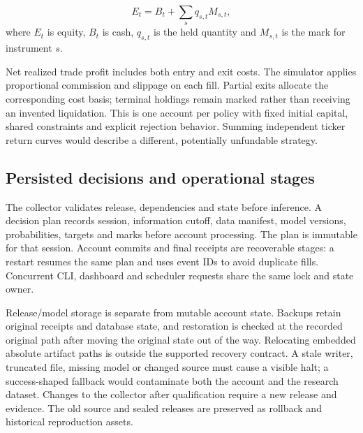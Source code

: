 \begin{equation}\label{eq:equity}E_t=B_t+\sum_s q_{s,t}M_{s,t},\end{equation}\noindent where $E_t$ is equity, $B_t$ is cash, $q_{s,t}$ is the held quantity and $M_{s,t}$ is the mark for instrument $s$.

Net realized trade profit includes both entry and exit costs. The simulator applies proportional commission and slippage on each fill. Partial exits allocate the corresponding cost basis; terminal holdings remain marked rather than receiving an invented liquidation. This is one account per policy with fixed initial capital, shared constraints and explicit rejection behavior. Summing independent ticker return curves would describe a different, potentially unfundable strategy.

\subsection{Persisted decisions and operational stages}

The collector validates release, dependencies and state before inference. A decision plan records session, information cutoff, data manifest, model versions, probabilities, targets and marks before account processing. The plan is immutable for that session. Account commits and final receipts are recoverable stages: a restart resumes the same plan and uses event IDs to avoid duplicate fills. Concurrent CLI, dashboard and scheduler requests share the same lock and state owner.

Release/model storage is separate from mutable account state. Backups retain original receipts and database state, and restoration is checked at the recorded original path after moving the original state out of the way. Relocating embedded absolute artifact paths is outside the supported recovery contract. A stale writer, truncated file, missing model or changed source must cause a visible halt; a success-shaped fallback would contaminate both the account and the research dataset. Changes to the collector after qualification require a new release and evidence. The old source and sealed releases are preserved as rollback and historical reproduction assets.
